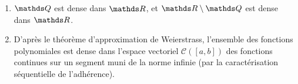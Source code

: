 \begin{exm}
	\begin{enumerate}
		\item $\Q$\/ est dense dans $\R$, et $\R \setminus \Q$\/ est dense dans $\R$.
		\item D'après le théorème d'approximation de Weierstrass, l'ensemble des fonctions polynomiales est dense dans l'espace vectoriel $\mathcal{C}([a,b])$\/ des fonctions continues sur un segment muni de la {\color{red}norme infinie} (par la caractérisation séquentielle de l'adhérence).
	\end{enumerate}
\end{exm}
